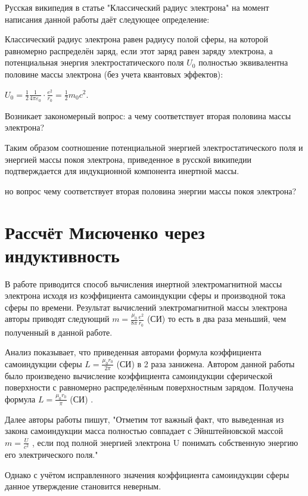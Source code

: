 \documentclass{article}
\begin{document}
Русская википедия в статье "Классический радиус электрона"  на момент написания данной работы даёт следующее определение:

Классический радиус электрона равен радиусу полой сферы, на которой равномерно распределён заряд, если этот заряд равен заряду электрона, а потенциальная энергия электростатического поля ${U}_{0}$ полностью эквивалентна половине массы электрона (без учета квантовых эффектов):

${\displaystyle U_{0}={\frac {1}{2}}{\frac {1}{4\pi \varepsilon _{0}}}\cdot {\frac {e^{2}}{r_{0}}}={\frac {1}{2}}m_{0}c^{2}}$.

Возникает закономерный вопрос: а чему соответствует вторая половина массы электрона?


Таким образом соотношение потенциальной энергией электростатического поля и энергией массы покоя электрона, приведенное в русской википедии подтверждается для индукционной компонента инертной массы.

но вопрос чему соответствует вторая половина энергии массы покоя электрона?

\section{Рассчёт Мисюченко через индуктивность}

В работе \cite{misyuchenko} приводится способ вычисления инертной электромагнитной массы электрона исходя из коэффициента самоиндукции сферы и производной тока сферы по времени. Результат вычислений электромагнитной массы электрона авторы приводят следующий $m =\frac{{{\mu }_{0}}}{8\pi }\frac{e^2}{{{r}_{0}}}$ (СИ) то есть в два раза меньший, чем полученный в данной работе.

Анализ показывает, что приведенная авторами формула коэффициента самоиндукции сферы $L =\frac{{{\mu }_{0}}{r}_{0}}{2\pi }$ (СИ) в 2 раза занижена. Автором данной работы было произведено вычисление коэффициента самоиндукции сферической поверхности с равномерно распределённым поверхностным зарядом. Получена формула $L =\frac{{{\mu }_{0}}{r}_{0}}{\pi }$ (СИ) .

Далее авторы  работы \cite{misyuchenko} пишут, "Отметим тот важный факт, что выведенная из закона самоиндукции масса полностью совпадает с Эйнштейновской массой $m=\frac{U}{c^2}$ , если под полной энергией электрона U понимать собственную энергию его электрического поля."

Однако с учётом исправленного значения коэффициента самоиндукции сферы данное утверждение становится неверным.
\end{document}
